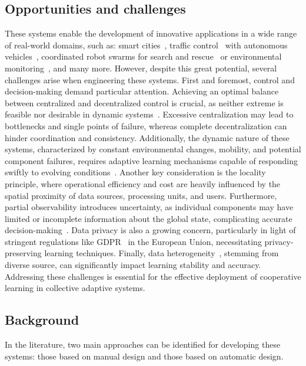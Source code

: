 \documentclass[12pt]{article}
\begin{document}
\subsection{Opportunities and challenges}
These systems enable the development of innovative applications in a wide range of real-world domains, such as: 
 smart cities~\cite{DBLP:conf/icse/IftikharRBW017}, 
 traffic control~\cite{DBLP:journals/tits/ChuWCL20,DBLP:books/sp/Muller2011/ProthmannTBHMS11} 
 with autonomous vehicles~\cite{DBLP:journals/corr/BojarskiTDFFGJM16}, 
 coordinated robot swarms for search and rescue~\cite{DBLP:journals/ijon/ZhouLLXS21} 
 or environmental monitoring~\cite{DBLP:conf/acsos/AguzziVE23}, and many more.
%
However, despite this great potential, several challenges arise when engineering these systems.
%
First and foremost, control and decision-making demand particular attention.
%
Achieving an optimal balance between centralized and decentralized control is crucial, 
 as neither extreme is feasible nor desirable in dynamic systems~\cite{DBLP:conf/coordination/CasadeiPVN19}. 
% 
Excessive centralization may lead to bottlenecks and single points of failure, 
 whereas complete decentralization can hinder coordination and consistency.
%
Additionally, the dynamic nature of these systems, characterized by constant 
 environmental changes, mobility, and potential component failures, requires adaptive 
 learning mechanisms capable of responding swiftly 
 to evolving conditions~\cite{DBLP:journals/swarm/PrasetyoMF19}.
%
Another key consideration is the locality principle, where operational efficiency and cost 
 are heavily influenced by the spatial proximity of data sources, processing units, and users.
%
Furthermore, partial observability introduces uncertainty, as individual components may have 
 limited or incomplete information about the global state, complicating accurate 
 decision-making~\cite{DBLP:conf/uai/HeDB22}.
%
Data privacy is also a growing concern, particularly in light of stringent regulations like GDPR~\cite{GDPR}
 in the European Union, necessitating privacy-preserving learning techniques.
%
Finally, data heterogeneity~\cite{DBLP:journals/fgcs/MaZLCQ22,DBLP:journals/ijon/ZhuXLJ21},
 stemming from diverse source, can significantly impact learning stability and accuracy.
%
Addressing these challenges is essential for the effective deployment of cooperative learning 
 in collective adaptive systems.

\subsection{Background}
In the literature, two main approaches can be identified for developing these systems: 
 those based on manual design and those based on automatic design.
\end{document}
